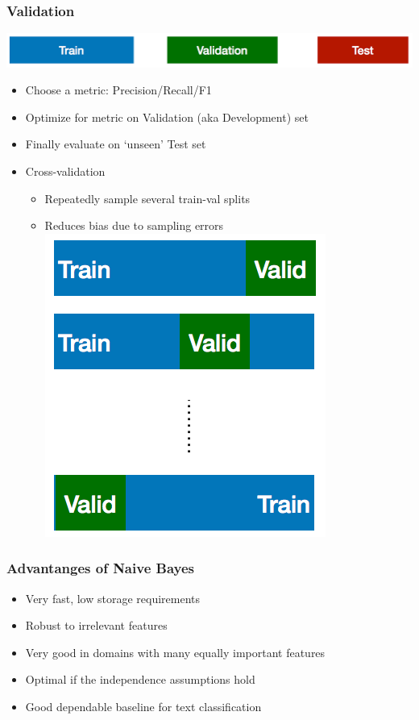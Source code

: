 \begin{frame}
\frametitle{Validation}
\includegraphics[scale=0.25]{figures/classifiers/splits.png}
\begin{itemize}[<+->]
\item Choose a metric: Precision/Recall/F1
\item Optimize for metric on {\color{green} Validation} (aka Development) set
\item Finally evaluate on ‘unseen’ {\color{red} Test} set
\item Cross-validation
  \begin{itemize}
  \item Repeatedly sample several train-val splits
  \item Reduces bias due to sampling errors \\
  \includegraphics[scale=0.25]{figures/classifiers/cv.png}
  \end{itemize}
\end{itemize}
\end{frame}

\begin{frame}
\frametitle{Advantanges of Naive Bayes}
\begin{itemize}[<+->]
\item Very fast, low storage requirements
\item Robust to irrelevant features
\item Very good in domains with many equally important features
\item Optimal if the independence assumptions hold
\item Good dependable baseline for text classification
\end{itemize}
\end{frame}


